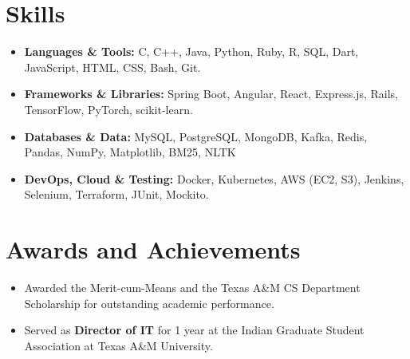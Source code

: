 \documentclass[letterpaper,10pt]{article}
\newcommand{\resumeItem}[1]{
  \item\small{
    {#1 \vspace{-2pt}}
  }
}
\newcommand{\resumeSubHeadingListStart}{\begin{itemize}[leftmargin=0.15in, label={}]}
\newcommand{\resumeSubHeadingListEnd}{\end{itemize}}
\newcommand{\resumeItemListStart}{\begin{itemize}}
\newcommand{\resumeItemListEnd}{\end{itemize}\vspace{-5pt}}
\newcommand{\resumeCertificationHeading}[1]{
  \vspace{-2pt}\item
    \textbf{#1}\vspace{-7pt}
}
\begin{document}
\section{Skills}
  \resumeSubHeadingListStart
    \resumeItemListStart
         \resumeItem{\textbf{Languages \& Tools:} C, C++, Java, Python, Ruby, R, SQL, Dart, JavaScript, HTML, CSS, Bash, Git.}
          \resumeItem{\textbf{Frameworks \& Libraries:} Spring Boot, Angular, React, Express.js, Rails, TensorFlow, PyTorch, scikit-learn.}
          \resumeItem{\textbf{Databases \& Data:} MySQL, PostgreSQL, MongoDB, Kafka, Redis, Pandas, NumPy, Matplotlib, BM25, NLTK}
          \resumeItem{\textbf{DevOps, Cloud \& Testing:} Docker, Kubernetes, AWS (EC2, S3), Jenkins, Selenium, Terraform, JUnit, Mockito.}
    \resumeItemListEnd
  \resumeSubHeadingListEnd





\section{Awards and Achievements}
  \resumeSubHeadingListStart
    \resumeItemListStart
        \resumeItem{Awarded the Merit-cum-Means and the Texas A\&M CS Department Scholarship for outstanding academic performance.}
        \resumeItem{Served as \textbf{Director of IT} for 1 year at the Indian Graduate Student Association at Texas A\&M University.}
    \resumeItemListEnd
  \resumeSubHeadingListEnd
\end{document}
